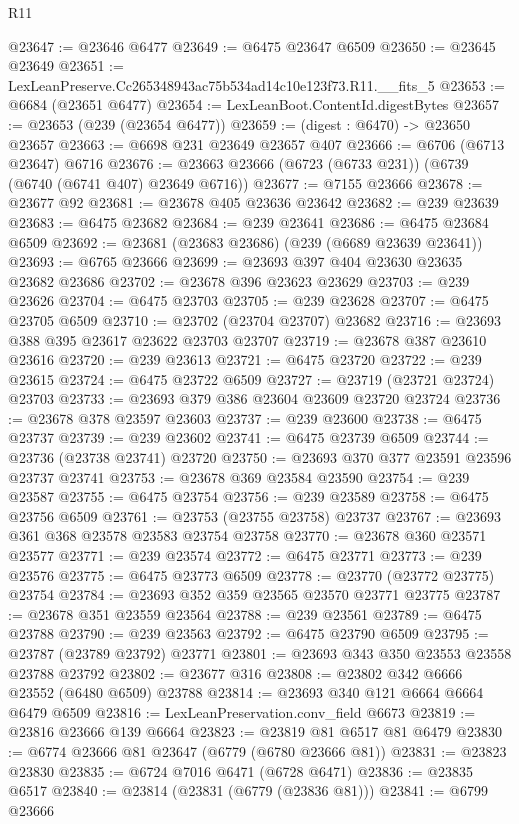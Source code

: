\begin{lexlean}{R11}
\begin{coremodule}
@23647 := @23646 @6477
@23649 := @6475 @23647 @6509
@23650 := @23645 @23649
@23651 := LexLeanPreserve.Cc265348943ac75b534ad14c10e123f73.R11.__fits_5
@23653 := @6684 (@23651 @6477)
@23654 := LexLeanBoot.ContentId.digestBytes
@23657 := @23653 (@239 (@23654 @6477))
@23659 := (digest : @6470) -> @23650 @23657
@23663 := @6698 @231 @23649 @23657 @407
@23666 := @6706 (@6713 @23647) @6716
@23676 := @23663 @23666 (@6723 (@6733 @231)) (@6739 (@6740 (@6741 @407) @23649 @6716))
@23677 := @7155 @23666
@23678 := @23677 @92
@23681 := @23678 @405 @23636 @23642
@23682 := @239 @23639
@23683 := @6475 @23682
@23684 := @239 @23641
@23686 := @6475 @23684 @6509
@23692 := @23681 (@23683 @23686) (@239 (@6689 @23639 @23641))
@23693 := @6765 @23666
@23699 := @23693 @397 @404 @23630 @23635 @23682 @23686
@23702 := @23678 @396 @23623 @23629
@23703 := @239 @23626
@23704 := @6475 @23703
@23705 := @239 @23628
@23707 := @6475 @23705 @6509
@23710 := @23702 (@23704 @23707) @23682
@23716 := @23693 @388 @395 @23617 @23622 @23703 @23707
@23719 := @23678 @387 @23610 @23616
@23720 := @239 @23613
@23721 := @6475 @23720
@23722 := @239 @23615
@23724 := @6475 @23722 @6509
@23727 := @23719 (@23721 @23724) @23703
@23733 := @23693 @379 @386 @23604 @23609 @23720 @23724
@23736 := @23678 @378 @23597 @23603
@23737 := @239 @23600
@23738 := @6475 @23737
@23739 := @239 @23602
@23741 := @6475 @23739 @6509
@23744 := @23736 (@23738 @23741) @23720
@23750 := @23693 @370 @377 @23591 @23596 @23737 @23741
@23753 := @23678 @369 @23584 @23590
@23754 := @239 @23587
@23755 := @6475 @23754
@23756 := @239 @23589
@23758 := @6475 @23756 @6509
@23761 := @23753 (@23755 @23758) @23737
@23767 := @23693 @361 @368 @23578 @23583 @23754 @23758
@23770 := @23678 @360 @23571 @23577
@23771 := @239 @23574
@23772 := @6475 @23771
@23773 := @239 @23576
@23775 := @6475 @23773 @6509
@23778 := @23770 (@23772 @23775) @23754
@23784 := @23693 @352 @359 @23565 @23570 @23771 @23775
@23787 := @23678 @351 @23559 @23564
@23788 := @239 @23561
@23789 := @6475 @23788
@23790 := @239 @23563
@23792 := @6475 @23790 @6509
@23795 := @23787 (@23789 @23792) @23771
@23801 := @23693 @343 @350 @23553 @23558 @23788 @23792
@23802 := @23677 @316
@23808 := @23802 @342 @6666 @23552 (@6480 @6509) @23788
@23814 := @23693 @340 @121 @6664 @6664 @6479 @6509
@23816 := LexLeanPreservation.conv_field @6673
@23819 := @23816 @23666 @139 @6664
@23823 := @23819 @81 @6517 @81 @6479
@23830 := @6774 @23666 @81 @23647 (@6779 (@6780 @23666 @81))
@23831 := @23823 @23830
@23835 := @6724 @7016 @6471 (@6728 @6471)
@23836 := @23835 @6517
@23840 := @23814 (@23831 (@6779 (@23836 @81)))
@23841 := @6799 @23666

\end{coremodule}
\end{lexlean}
